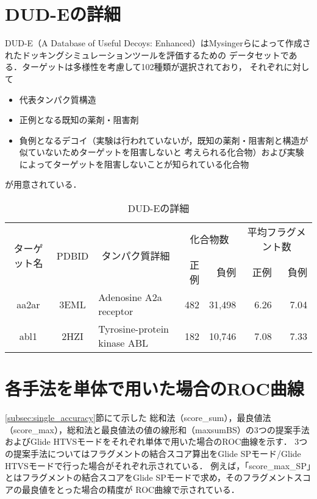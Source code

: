 \appendix
\chapter{DUD-Eの詳細}\label{appendix:dude}
DUD-E（A Database of Useful Decoys: Enhanced）はMysingerらによって作成されたドッキングシミュレーションツールを評価するための
データセットである\cite{Mysinger2012}．ターゲットは多様性を考慮して102種類が選択されており，
それぞれに対して
\begin{itemize}
\item 代表タンパク質構造
\item 正例となる既知の薬剤・阻害剤
\item 負例となるデコイ（実験は行われていないが，既知の薬剤・阻害剤と構造が似ていないためターゲットを阻害しないと
	考えられる化合物）および実験によってターゲットを阻害しないことが知られている化合物
\end{itemize}
が用意されている．
\begin{table}[htb] \centering
	\caption{DUD-Eの詳細}
	\label{tb:dude_description}
	\begin{tabular}{c|c|p{5cm}|rr|rr}
	\hline
	\multirow{2}{*}{ターゲット名}	&\multirow{2}{*}{PDBID}	&\multicolumn{1}{c|}{\multirow{2}{*}{タンパク質詳細}}	&\multicolumn{2}{c|}{化合物数}	&\multicolumn{2}{c}{平均フラグメント数}		\\
							&					&											&正例	&負例				&正例	&負例						\\ \hline
	aa2ar					&3EML				&Adenosine A2a receptor						&482	&31,498				&6.26	&7.04						\\
	abl1						&2HZI				&Tyrosine-protein kinase ABL					&182	&10,746				&7.08	&7.33						\\ \hline
	\end{tabular}
\end{table}

\chapter{各手法を単体で用いた場合のROC曲線}\label{appendix:roc}
\ref{subsec:single_accuracy}節にて示した
総和法（score\_sum），最良値法（score\_max），総和法と最良値法の値の線形和（maxsumBS）の3つの提案手法
およびGlide HTVSモードをそれぞれ単体で用いた場合のROC曲線を示す．
3つの提案手法についてはフラグメントの結合スコア算出をGlide SPモード/Glide HTVSモードで行った場合がそれぞれ示されている．
例えば，「score\_max\_SP」とはフラグメントの結合スコアをGlide SPモードで求め，そのフラグメントスコアの最良値をとった場合の精度が
ROC曲線で示されている．

